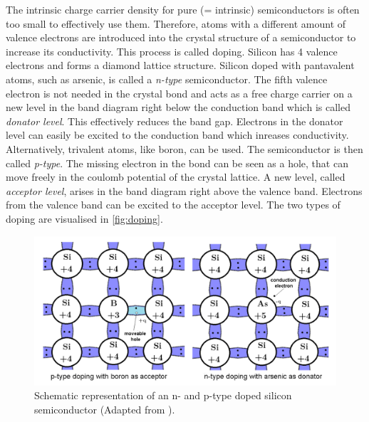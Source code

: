 The intrinsic charge carrier density for pure (= intrinsic) semiconductors is often too small to effectively use them. Therefore, atoms with a different amount of 
valence electrons are introduced
into the crystal structure of a semiconductor to increase its conductivity. This process is called doping. Silicon has 4 valence electrons and forms a diamond lattice structure. 
Silicon doped with pantavalent atoms, such as arsenic, is called a \textit{n-type} semiconductor. The fifth valence electron is not needed in the crystal bond and acts as a free 
charge carrier on a new level in the band diagram right below the conduction band which is called \textit{donator level}. This effectively reduces the band gap. 
Electrons in the donator level can easily be excited to the conduction band which inreases conductivity. \\
Alternatively, trivalent atoms, like boron, can be used. The semiconductor is then called \textit{p-type}. The missing electron in the bond can be seen as a hole, that can
move freely in the coulomb potential of the crystal lattice. A new level, called \textit{acceptor level}, arises in the band diagram right above the valence band.
Electrons from the valence band can be excited to the acceptor level.
The two types of doping are visualised in \autoref{fig:doping}.
\begin{figure}
    \centering 
    \includegraphics[width = .75\textwidth]{content/pics/doping.png}
    \caption{Schematic representation of an n- and p-type doped silicon semiconductor (Adapted from \cite{SiliconStrip}).}
    \label{fig:doping}
\end{figure}

